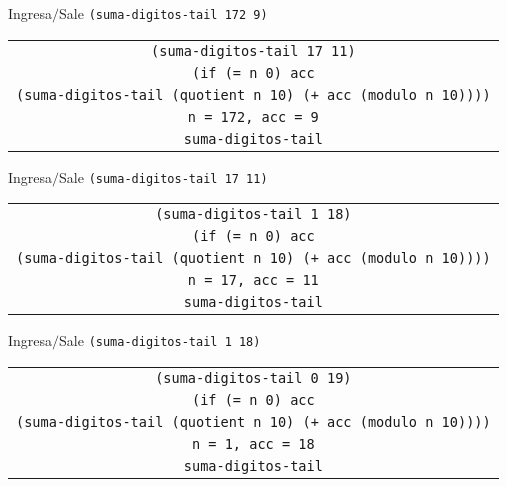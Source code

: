 \documentclass[letterpaper,11pt]{article}
\begin{document}
\begin{enumerate}
\begin{enumerate}
        Ingresa$/$Sale \texttt{(suma-digitos-tail 172 9)}
        \begin{center}
            \begin{tabular}[h]{|c|}
                \hline
                \texttt{(suma-digitos-tail 17 11)} \\
                \texttt{(if (= n 0) acc} \\
                \texttt{(suma-digitos-tail (quotient n 10) 
                (+ acc (modulo n 10))))} \\
                \texttt{n = 172, acc = 9} \\
                \texttt{suma-digitos-tail} \\
                \hline
            \end{tabular}
        \end{center}

        Ingresa$/$Sale \texttt{(suma-digitos-tail 17 11)}
        \begin{center}
            \begin{tabular}[h]{|c|}
                \hline
                \texttt{(suma-digitos-tail 1 18)} \\
                \texttt{(if (= n 0) acc} \\
                \texttt{(suma-digitos-tail (quotient n 10) 
                (+ acc (modulo n 10))))} \\
                \texttt{n = 17, acc = 11} \\
                \texttt{suma-digitos-tail} \\
                \hline
            \end{tabular}
        \end{center}

        Ingresa$/$Sale \texttt{(suma-digitos-tail 1 18)}
        \begin{center}
            \begin{tabular}[h]{|c|}
                \hline
                \texttt{(suma-digitos-tail 0 19)} \\
                \texttt{(if (= n 0) acc} \\
                \texttt{(suma-digitos-tail (quotient n 10) 
                (+ acc (modulo n 10))))} \\
                \texttt{n = 1, acc = 18} \\
                \texttt{suma-digitos-tail} \\
                \hline
            \end{tabular}
        \end{center}


\end{enumerate}
\end{enumerate}
\end{document}
